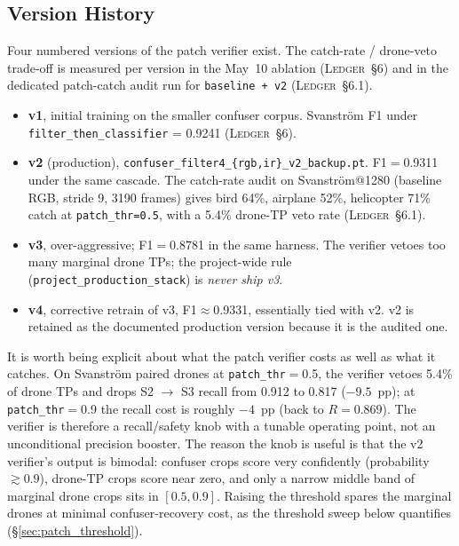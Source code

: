 \documentclass[12pt,a4paper,oneside,openright]{book}
\begin{document}
\subsection{Version History}

Four numbered versions of the patch verifier exist. The catch-rate / drone-veto trade-off is measured per version in the May~10 ablation (\textsc{Ledger}~\S6) and in the dedicated patch-catch audit run for \texttt{baseline + v2} (\textsc{Ledger}~\S6.1).

\begin{itemize}
    \item \textbf{v1}, initial training on the smaller confuser corpus. Svanstr\"om F1 under \texttt{filter\_then\_classifier} = 0.9241 (\textsc{Ledger}~\S6).
    \item \textbf{v2} (production), \texttt{confuser\_filter4\_\{rgb,ir\}\_v2\_backup.pt}. F1$=$0.9311 under the same cascade. The catch-rate audit on Svanstr\"om@1280 (baseline RGB, stride 9, 3190 frames) gives bird 64\%, airplane 52\%, helicopter 71\% catch at \texttt{patch\_thr=0.5}, with a 5.4\% drone-TP veto rate (\textsc{Ledger}~\S6.1).
    \item \textbf{v3}, over-aggressive; F1$=$0.8781 in the same harness. The verifier vetoes too many marginal drone TPs; the project-wide rule (\texttt{project\_production\_stack}) is \emph{never ship v3}.
    \item \textbf{v4}, corrective retrain of v3, F1$\approx$0.9331, essentially tied with v2. v2 is retained as the documented production version because it is the audited one.
\end{itemize}

It is worth being explicit about what the patch verifier costs as well as what it catches. On Svanstr\"om paired drones at \texttt{patch\_thr}$=$0.5, the verifier vetoes 5.4\% of drone TPs and drops S2 $\to$ S3 recall from 0.912 to 0.817 ($-9.5$~pp); at \texttt{patch\_thr}$=$0.9 the recall cost is roughly $-4$~pp (back to $R=0.869$). The verifier is therefore a recall/safety knob with a tunable operating point, not an unconditional precision booster. The reason the knob is useful is that the v2 verifier's output is bimodal: confuser crops score very confidently (probability $\gtrsim 0.9$), drone-TP crops score near zero, and only a narrow middle band of marginal drone crops sits in $[0.5, 0.9]$. Raising the threshold spares the marginal drones at minimal confuser-recovery cost, as the threshold sweep below quantifies (\S\ref{sec:patch_threshold}).
\end{document}
